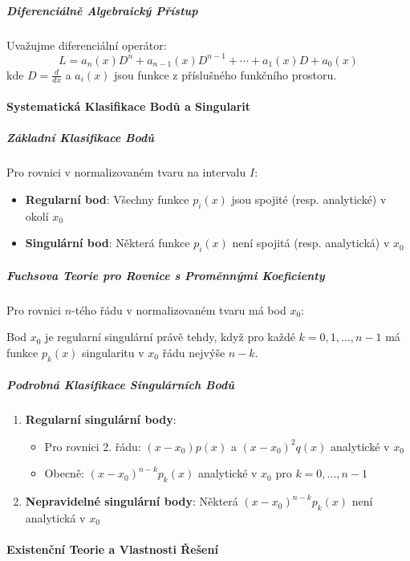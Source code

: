 \subparagraph*{Diferenciálně Algebraický Přístup}
Uvažujme diferenciální operátor:
\[
L = a_n(x)D^n + a_{n-1}(x)D^{n-1} + \cdots + a_1(x)D + a_0(x)
\]
kde $D = \frac{d}{dx}$ a $a_i(x)$ jsou funkce z příslušného funkčního prostoru.

\paragraph*{Systematická Klasifikace Bodů a Singularit}

\subparagraph*{Základní Klasifikace Bodů}
Pro rovnici v normalizovaném tvaru na intervalu $I$:
\begin{itemize}
\item \textbf{Regularní bod}: Všechny funkce $p_i(x)$ jsou spojité (resp. analytické) v okolí $x_0$
\item \textbf{Singulární bod}: Některá funkce $p_i(x)$ není spojitá (resp. analytická) v $x_0$
\end{itemize}

\subparagraph*{Fuchsova Teorie pro Rovnice s Proměnnými Koeficienty}
Pro rovnici $n$-tého řádu v normalizovaném tvaru má bod $x_0$:

\begin{theorem}
Bod $x_0$ je regularní singulární právě tehdy, když pro každé $k = 0, 1, \dots, n-1$ má funkce $p_k(x)$ singularitu v $x_0$ řádu nejvýše $n-k$.
\end{theorem}

\subparagraph*{Podrobná Klasifikace Singulárních Bodů}
\begin{enumerate}
\item \textbf{Regularní singulární body}: 
\begin{itemize}
\item Pro rovnici 2. řádu: $(x-x_0)p(x)$ a $(x-x_0)^2q(x)$ analytické v $x_0$
\item Obecně: $(x-x_0)^{n-k}p_k(x)$ analytické v $x_0$ pro $k=0,\dots,n-1$
\end{itemize}

\item \textbf{Nepravidelné singulární body}: Některá $(x-x_0)^{n-k}p_k(x)$ není analytická v $x_0$
\end{enumerate}

\paragraph*{Existenční Teorie a Vlastnosti Řešení}

